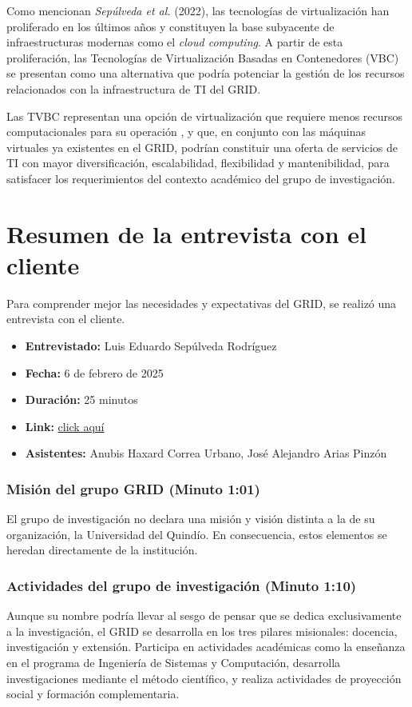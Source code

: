 Como mencionan \textit{Sepúlveda et al.} (2022), las tecnologías de virtualización han proliferado en los últimos años y constituyen la base subyacente de infraestructuras modernas como el \textit{cloud computing}. A partir de esta proliferación, las Tecnologías de Virtualización Basadas en Contenedores (VBC) se presentan como una alternativa que podría potenciar la gestión de los recursos relacionados con la infraestructura de TI del GRID.\@

Las TVBC representan una opción de virtualización que requiere menos recursos computacionales para su operación \citep{Xavier2013}, y que, en conjunto con las máquinas virtuales ya existentes en el GRID, podrían constituir una oferta de servicios de TI con mayor diversificación, escalabilidad, flexibilidad y mantenibilidad, para satisfacer los requerimientos del contexto académico del grupo de investigación.

\section{Resumen de la entrevista con el cliente}

Para comprender mejor las necesidades y expectativas del GRID, se realizó una entrevista con el cliente.

\begin{itemize}
  \item \textbf{Entrevistado:} Luis Eduardo Sepúlveda Rodríguez
  \item \textbf{Fecha:} 6 de febrero de 2025
  \item \textbf{Duración:} 25 minutos
  \item \textbf{Link:} \href{https://drive.google.com/file/d/1rIc9xOsyDqumlTV-QXcw0inPyIbSEHLz/view?usp=sharing}{click aquí}
  \item \textbf{Asistentes:} Anubis Haxard Correa Urbano, José Alejandro Arias Pinzón
\end{itemize}

\subsubsection{Misión del grupo GRID (Minuto 1:01)}
El grupo de investigación no declara una misión y visión distinta a la de su organización, la Universidad del Quindío. En consecuencia, estos elementos se heredan directamente de la institución.

\subsubsection{Actividades del grupo de investigación (Minuto 1:10)}
Aunque su nombre podría llevar al sesgo de pensar que se dedica exclusivamente a la investigación, el GRID se desarrolla en los tres pilares misionales: docencia, investigación y extensión. Participa en actividades académicas como la enseñanza en el programa de Ingeniería de Sistemas y Computación, desarrolla investigaciones mediante el método científico, y realiza actividades de proyección social y formación complementaria.

